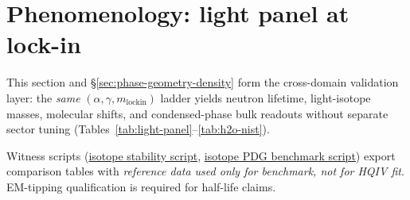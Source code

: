 \documentclass[11pt,notitlepage]{amsart}
\begin{document}
\section{Phenomenology: light panel at lock-in}
\label{sec:phenomenology}

This section and \S\ref{sec:phase-geometry-density} form the cross-domain validation
layer: the \emph{same} $(\alpha,\gamma,m_{\mathrm{lockin}})$ ladder yields neutron
lifetime, light-isotope masses, molecular shifts, and condensed-phase bulk readouts without
separate sector tuning (Tables~\ref{tab:light-panel}--\ref{tab:h2o-nist}).

Witness scripts (\hyperref[app:scripts]{isotope stability script},
\hyperref[app:scripts]{isotope PDG benchmark script}) export comparison tables with
\emph{reference data used only for benchmark, not for HQIV fit}. EM-tipping
qualification is required for half-life claims.
\end{document}
